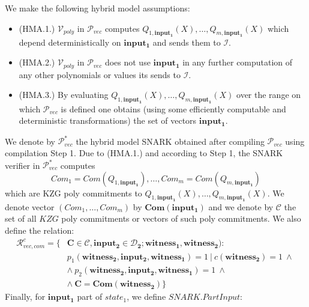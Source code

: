 \noindent We make the following hybrid model assumptions:
\begin{itemize}
\item (HMA.1.) $\mathcal{V}_{poly}$ in $\mathscr{P}_{\mathit{vec}}$ computes 
$\mathit{Q_{1,\mathbf{input_1}}}(X), \ldots, \mathit{Q_{m, \mathbf{input_1}}}(X)$ which depend deterministically on $\mathbf{input_1}$ and sends them to $\mathcal{I}$. 
\item (HMA.2.) $\mathcal{V}_{poly}$ in $\mathscr{P}_{\mathit{vec}}$ does not use $\mathbf{input_1}$ in any further computation of 
any other polynomials or values its sends to $\mathcal{I}$.
\item (HMA.3.) By evaluating $\mathit{Q_{1,\mathbf{input_1}}}(X), \ldots, \mathit{Q_{m, \mathbf{input_1}}}(X)$ over the range on which 
$\mathscr{P}_{\mathit{vec}}$ is defined one obtains (using some efficiently computable and deterministic transformations) the set of vectors $\mathbf{input_1}$. 
\end{itemize} 
We denote by $\mathscr{P}^*_{\mathit{vec}}$ the hybrid model SNARK obtained after compiling $\mathscr{P}_{\mathit{vec}}$ using compilation Step 1. 
Due to (HMA.1.) and according to Step 1, the SNARK verifier in 
$\mathscr{P}^*_{\mathit{vec}}$ computes $$\mathit{Com_1} = \mathit{Com}(\mathit{Q_{1,\mathbf{input_1}}}), \ldots, \mathit{Com_m} = \mathit{Com}(\mathit{Q_{m,\mathbf{input_1}}})$$ 
which are KZG poly commitments to $\mathit{Q_{1,\mathbf{input_1}}}(X), \ldots, \mathit{Q_{m, \mathbf{input_1}}}(X)$. We denote vector
$(\mathit{Com_1}, \ldots, \mathit{Com_m})$ by $\mathbf{Com}(\mathbf{input_1})$ and we denote 
by $\mathcal{C}$ the set of all $\mathit{KZG}$ poly commitments or vectors of such poly commitments. We also define the relation: 
\begin{align*}
\mathcal{R}_{\mathit{vec}, \mathit{com}}^c = \{& \mathbf{C} \in \mathcal{C}, \mathbf{input_2} \in \mathbf{\mathcal{D}_2}; \mathbf{witness_1}, \mathbf{witness_2}):  \\
& p_1(\mathbf{witness_2}, \mathbf{input_2}, \mathbf{witness_1}) =1  \ |\ c(\mathbf{witness_2}) = 1  \ \wedge\  \\
& \wedge\ p_2(\mathbf{witness_2}, \mathbf{input_2}, \mathbf{witness_1}) = 1\ \wedge \\
& \wedge\ \mathbf{C} = \mathbf{Com}(\mathbf{witness_2})\}
\end{align*}
\noindent Finally, for $\mathbf{input_1}$ part of $\mathit{state_1}$, we define $\mathit{SNARK.PartInput}$:
